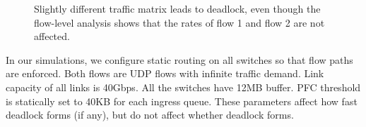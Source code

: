 \begin{figure}[t]
\centering

\vspace{-0.15in}
\caption{Slightly different traffic matrix leads to deadlock, even though
the flow-level analysis shows that the rates of flow 1 and flow 2 are not affected.
}
\vspace{-0.15in}
\label{fig:case2}
\end{figure}

In our simulations, we configure static routing on all switches so that flow paths are enforced. 
Both flows are UDP flows with infinite traffic demand. Link capacity of 
all links is 40Gbps. All the switches have 12MB buffer. PFC threshold is statically set to 40KB for 
each ingress queue. These parameters affect how fast deadlock forms (if any), but do not affect whether deadlock forms.

